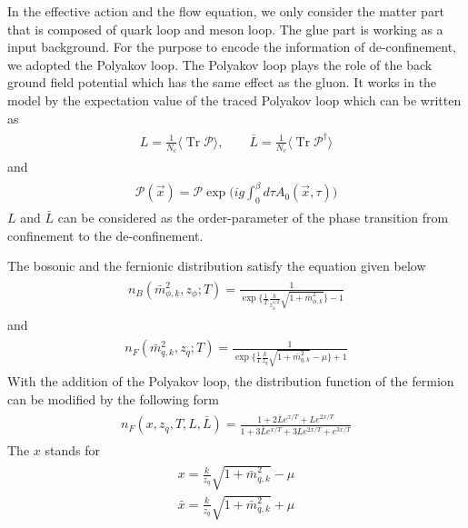 \documentclass[%
reprint,
superscriptaddress,
showpacs,preprintnumbers,
 amsmath,amssymb,
 aps,
prd,
]{revtex4-1}
\newcommand{\Tr}{\ensuremath{\operatorname{Tr}}}
\begin{document}
In the effective action and the flow equation, we only consider the matter part that is composed of quark loop and meson loop. The 
glue part is working as a input background. For the purpose to encode the information of de-confinement, we adopted the Polyakov 
loop. The Polyakov loop plays the role of the back ground field potential which has the same effect as the gluon. It works in the model by the 
expectation value of the traced Polyakov loop which can be written as
\begin{align}\label{}
\begin{split}
L=\frac{1}{N_c}\langle \Tr{\mathcal{P}} \rangle ,\qquad \bar{L}=\frac{1}{N_c}\langle \Tr{\mathcal{P^{\dagger}}} \rangle
\end{split}
\end{align}
and
\begin{align}\label{}
\begin{split}
\mathcal{P}(\vec{x})=\mathcal{P}\exp\bigg( ig\int_{0}^{\beta}d\tau A_0(\vec{x},\tau) \bigg)
\end{split}
\end{align}
$L$ and $\bar{L}$ can be considered as the order-parameter of the phase transition from confinement to the de-confinement.\par


The bosonic and the fernionic distribution satisfy the equation given below
\begin{align}
\begin{split}
n_B(\bar{m}^{2}_{\phi,k},z_\phi;T)=\frac{1}{\exp\lbrace \frac{1}{T}\frac{k}{z_\phi^{1/2}}\sqrt{1+\bar{m}^{2}_{\phi,k}}
\rbrace-1}
\end{split}
\end{align} 
and
\begin{align}
\begin{split}
n_F(\bar{m}^{2}_{q,k},z_q;T)=\frac{1}{\exp\lbrace \frac{1}{T}\frac{k}{z_q}\sqrt{1+\bar{m}^{2}_{q,k}}-\mu 
\rbrace+1}
\end{split}
\end{align} 
With the addition of the Polyakov loop, the distribution function of the fermion can be modified by the following form
\begin{align}
\begin{split}
n_F(x,z_q,T,L,\bar{L})=\frac{1+2\bar{L}e^{x/T}+Le^{2x/T}}{1+3\bar{L}e^{x/T}+3Le^{2x/T}+e^{3x/T}} 
\end{split}
\end{align} 
The $x$ stands for
\begin{align}
\begin{split}
x=\frac{k}{z_q}\sqrt{1+\bar{m}^{2}_{q,k}}-\mu \\
\bar{x}=\frac{k}{z_q}\sqrt{1+\bar{m}^{2}_{q,k}}+\mu
\end{split}
\end{align} 
\end{document}
